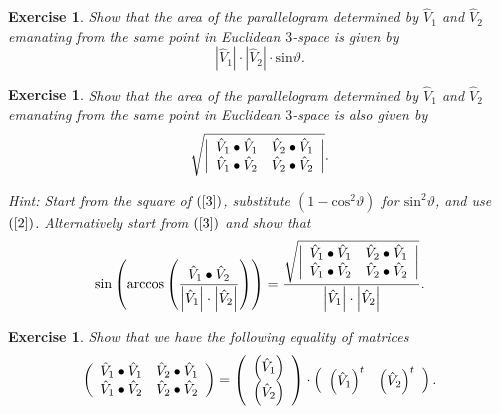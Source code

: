 \documentclass{article}%
\newtheorem{exercise}[theorem]{Exercise}
\begin{document}
\begin{exercise}
Show that the area of the parallelogram determined by $\hat{V}_{1}$ and
$\hat{V}_{2}$ emanating from the same point in Euclidean $3$-space is given by%
\begin{equation}
\left\vert \hat{V}_{1}\right\vert \cdot\left\vert \hat{V}_{2}\right\vert
\cdot\mathrm{sin}\vartheta. \label{3}%
\end{equation}

\end{exercise}

\begin{exercise}
\label{9}Show that the area of the parallelogram determined by $\hat{V}_{1}$
and $\hat{V}_{2}$ emanating from the same point in Euclidean $3$-space is also
given by%
\[
\sqrt{\left\vert
\begin{array}
[c]{cc}%
\hat{V}_{1}\bullet\hat{V}_{1} & \hat{V}_{2}\bullet\hat{V}_{1}\\
\hat{V}_{1}\bullet\hat{V}_{2} & \hat{V}_{2}\bullet\hat{V}_{2}%
\end{array}
\right\vert }.
\]


Hint: Start from the square of $\left(  \ref{3}\right)  $, substitute $\left(
1-\mathrm{cos}^{2}\vartheta\right)  $ for $\mathrm{sin}^{2}\vartheta$, and use
$\left(  \ref{2}\right)  $. Alternatively start from $\left(  \ref{3}\right)
$ and show that%
\[
\mathrm{sin}\left(  \mathrm{arccos}\left(  \frac{\hat{V}_{1}\bullet\hat{V}%
_{2}}{\left\vert \hat{V}_{1}\right\vert \cdot\left\vert \hat{V}_{2}\right\vert
}\right)  \right)  =\frac{\sqrt{\left\vert
\begin{array}
[c]{cc}%
\hat{V}_{1}\bullet\hat{V}_{1} & \hat{V}_{2}\bullet\hat{V}_{1}\\
\hat{V}_{1}\bullet\hat{V}_{2} & \hat{V}_{2}\bullet\hat{V}_{2}%
\end{array}
\right\vert }}{\left\vert \hat{V}_{1}\right\vert \cdot\left\vert \hat{V}%
_{2}\right\vert }.
\]

\end{exercise}

\begin{exercise}
Show that we have the following equality of matrices%
\[
\left(
\begin{array}
[c]{cc}%
\hat{V}_{1}\bullet\hat{V}_{1} & \hat{V}_{2}\bullet\hat{V}_{1}\\
\hat{V}_{1}\bullet\hat{V}_{2} & \hat{V}_{2}\bullet\hat{V}_{2}%
\end{array}
\right)  =\left(
\begin{array}
[c]{c}%
\left(  \hat{V}_{1}\right) \\
\left(  \hat{V}_{2}\right)
\end{array}
\right)  \cdot\left(
\begin{array}
[c]{cc}%
\left(  \hat{V}_{1}\right)  ^{t} & \left(  \hat{V}_{2}\right)  ^{t}%
\end{array}
\right)  .
\]

\end{exercise}
\end{document}
